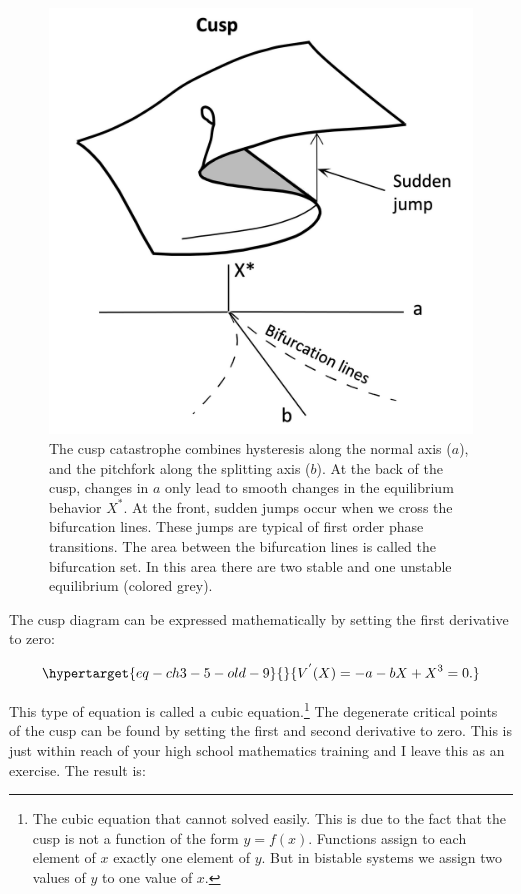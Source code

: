 \documentclass[
  a4paper,
  DIV=11,
  numbers=noendperiod,
  oneside]{scrreprt}
\begin{document}
\begin{figure}

{\centering \includegraphics{media/ch3/image10.jpg}

}

\caption{\label{fig-ch3-img10-old-22}The cusp catastrophe combines
hysteresis along the normal axis (\(a\)), and the pitchfork along the
splitting axis (\(b\)). At the back of the cusp, changes in \(a\) only
lead to smooth changes in the equilibrium behavior \(X^{*}\). At the
front, sudden jumps occur when we cross the bifurcation lines. These
jumps are typical of first order phase transitions. The area between the
bifurcation lines is called the bifurcation set. In this area there are
two stable and one unstable equilibrium (colored grey).}

\end{figure}

The cusp diagram can be expressed mathematically by setting the first
derivative to zero:

\begin{equation}\protect\hypertarget{eq-ch3-5-old-9}{}{
V^{'}(X) = {- a - bX + X}^{3} = 0.
}\label{eq-ch3-5-old-9}\end{equation}

This type of equation is called a cubic equation.\footnote{The cubic
  equation that cannot solved easily. This is due to the fact that the
  cusp is not a function of the form \(y = f(x)\). Functions assign to
  each element of \(x\) exactly one element of \(y\). But in bistable
  systems we assign two values of \(y\) to one value of \(x\).} The
degenerate critical points of the cusp can be found by setting the first
and second derivative to zero. This is just within reach of your high
school mathematics training and I leave this as an exercise. The result
is:
\end{document}
